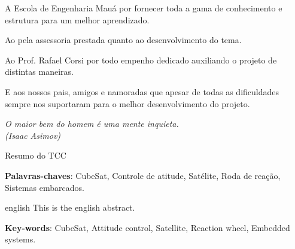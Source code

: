 \documentclass[
	12pt,				%
	openany,			%
	twoside,			%
	a4paper,			%
	english,			%
	french,				%
	spanish,			%
	brazil,				%
	oldfontcommands
	]{abntex2}
\begin{document}
\begin{agradecimentos}

A Escola de Engenharia Mauá por fornecer toda a gama de conhecimento e estrutura para um melhor aprendizado.\par

Ao {\imprimirorientador}  pela assessoria prestada quanto ao desenvolvimento do tema.\par

Ao Prof. Rafael Corsi por todo empenho dedicado auxiliando o projeto de distintas maneiras.\par

E aos nossos pais, amigos e namoradas que apesar de todas as dificuldades sempre nos suportaram para o melhor desenvolvimento do projeto.

\end{agradecimentos}

\begin{epigrafe}
    \vspace*{\fill}
	\begin{flushright}
		\textit{O maior bem do homem é uma mente inquieta.\\(Isaac Asimov)}
	\end{flushright}
\end{epigrafe}

\setlength{\absparsep}{18pt} %
\begin{resumo}
 Resumo do TCC

 \textbf{Palavras-chaves}: CubeSat, Controle de atitude, Satélite, Roda de reação, Sistemas embarcados.
\end{resumo}

\begin{resumo}[Abstract]
 \begin{otherlanguage*}{english}
   This is the english abstract.

   \vspace{\onelineskip}
 
   \noindent 
   \textbf{Key-words}: CubeSat, Attitude control, Satellite, Reaction wheel, Embedded systems.
 \end{otherlanguage*}
\end{resumo}

\listoffigures*
\cleardoublepage
\end{document}
